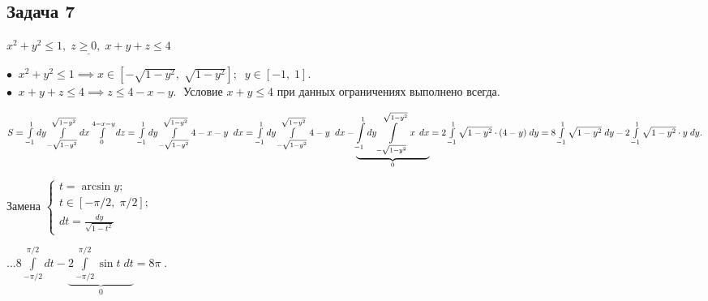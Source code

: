 \documentclass[a4paper, fleqn]{article}
\begin{document}
    
      \subsection*{Задача 7}
    
    $\underline{x^2 + y^2 \leq 1, \; z \geq 0, \; x + y + z \leq 4}$
    
    $\bullet \; \; x^2 + y^2 \leq 1 \implies x \in \left[-\sqrt{1 - y^2}, \; \sqrt{1 - y^2}\right]; \; \; y \in [-1, \; 1].$\\
    
    $\bullet \; \; x + y + z \leq 4 \implies z \leq 4 - x - y. \; $ Условие $x + y \leq 4$ при данных ограничениях выполнено всегда.
    
    $S = \int\limits_{-1}^{1}  dy \int\limits_{-\sqrt{1 - y^2}}^{\sqrt{1 - y^2}} dx \int\limits_{0}^{4 -x - y} dz =  \int\limits_{-1}^{1}  dy \int\limits_{-\sqrt{1 - y^2}}^{\sqrt{1 - y^2}} 4 -x - y \; \;  dx =  \int\limits_{-1}^{1}  dy \int\limits_{-\sqrt{1 - y^2}}^{\sqrt{1 - y^2}} 4 - y \; \; dx -  \underbrace{\int\limits_{-1}^{1}  dy \int\limits_{-\sqrt{1 - y^2}}^{\sqrt{1 - y^2}} x \, \; dx}_{0} = \\
    2 \int\limits_{-1}^{1}  \sqrt{1 - y^2} \cdot (4 - y) \;  dy = 
    8 \int\limits_{-1}^{1}  \sqrt{1 - y^2}  \;  dy - 2 \int\limits_{-1}^{1}  \sqrt{1 - y^2} \cdot  y \;  dy .$
    
    Замена $\begin{cases}
    t = \arcsin y;\\
    t \in \left[-\pi/2 , \; \pi/2\right];\\
    dt = \frac{dy}{\sqrt{1 - t^2}}
    \end{cases}$
    
    $\dots \displaystyle 8 \int\limits_{-\pi /2}^{\pi/2} dt - \underbrace{2 \int\limits_{-\pi /2}^{\pi/2} \sin t \; dt}_{0} = \boxed{8 \pi} \; . $
    
    
    
    
\end{document}

